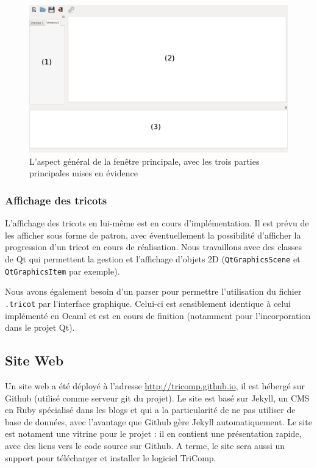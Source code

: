 \documentclass{article}
\begin{document}
\begin{figure}[!h]
  \begin{center}
    \includegraphics[scale=0.3]{fenetre.png}
  \end{center}
  \caption{L'aspect général de la fenêtre principale, avec les trois parties principales mises en évidence}
  \label{fenetre}
\end{figure}

\subsubsection{Affichage des tricots}

L'affichage des tricots en lui-même est en cours d'implémentation. Il est prévu de les afficher sous forme de patron, avec éventuellement
la possibilité d'afficher la progression d'un tricot en cours de réalisation.
Nous travaillons avec des classes de Qt qui permettent la gestion et l'affichage d'objets 2D (\texttt{QtGraphicsScene} et \texttt
{QtGraphicsItem} par exemple).

Nous avons également besoin d'un parser pour permettre l'utilisation du fichier \texttt{.tricot} par l'interface graphique. Celui-ci est sensiblement identique à celui implémenté en Ocaml et est en cours de finition (notamment pour l'incorporation dans le projet Qt).

\subsection{Site Web}

Un site web a été déployé à l'adresse \url{http://tricomp.github.io}, il est hébergé sur Github (utilisé comme serveur git du projet). Le
site est basé sur Jekyll, un CMS en Ruby spécialisé dans les blogs et qui a la particularité de ne pas utiliser de base de données, avec
l'avantage que Github gère Jekyll automatiquement. Le site est notament une vitrine pour le projet : il en contient une présentation
rapide, avec des liens vers le code source sur Github. A terme, le site sera aussi un support pour télécharger et installer le logiciel
TriComp.
\end{document}
